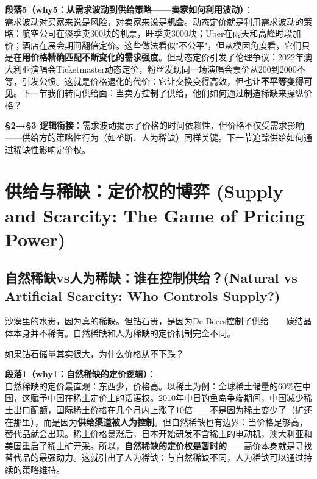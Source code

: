 \documentclass[../main.tex]{subfiles}
\begin{document}
	\textbf{段落5（why5：从需求波动到供给策略——卖家如何利用波动）}：\\
	需求波动对买家来说是风险，对卖家来说是\textbf{机会}。动态定价就是利用需求波动的策略：航空公司在淡季卖300块的机票，旺季卖3000块；Uber在雨天和高峰时段加价；酒店在展会期间翻倍定价。这些做法看似"不公平"，但从模因角度看，它们只是在\textbf{用价格精确匹配不断变化的需求强度}。但动态定价引发了伦理争议：2022年澳大利亚演唱会Ticketmaster动态定价，粉丝发现同一场演唱会票价从200到2000不等，引发公愤。这就是价格退化的代价：它让交换变得高效，但也让\textbf{不平等变得可见}。下一节我们转向供给面：当卖方控制了供给，他们如何通过制造稀缺来操纵价格？

	\textbf{§2→§3 逻辑衔接}：需求波动揭示了价格的时间依赖性，但价格不仅受需求影响——供给方的策略性行为（如垄断、人为稀缺）同样关键。下一节追踪供给如何通过稀缺性影响定价权。

	\section{供给与稀缺：定价权的博弈 (Supply and Scarcity: The Game of Pricing Power)}

	\subsection{自然稀缺vs人为稀缺：谁在控制供给？(Natural vs Artificial Scarcity: Who Controls Supply?)}
	\begin{motivation}
		沙漠里的水贵，因为真的稀缺。但钻石贵，是因为De Beers控制了供给——碳结晶体本身并不稀有。自然稀缺和人为稀缺的定价机制完全不同。
	\end{motivation}
	\begin{questionbox}
		如果钻石储量其实很大，为什么价格从不下跌？
	\end{questionbox}

	\textbf{段落1（why1：自然稀缺的定价逻辑）}：\\
	自然稀缺的定价最直观：东西少，价格高。以稀土为例：全球稀土储量的60\%在中国，这赋予中国在稀土定价上的话语权。2010年中日钓鱼岛争端期间，中国减少稀土出口配额，国际稀土价格在几个月内上涨了10倍——不是因为稀土变少了（矿还在那里），而是因为\textbf{供给渠道被人为控制}。但自然稀缺也有边界：当价格足够高，替代品就会出现。稀土价格暴涨后，日本开始研发不含稀土的电动机，澳大利亚和美国重启了稀土矿开采。所以，\textbf{自然稀缺的定价权是暂时的}——高价本身就是寻找替代品的最强动力。这就引出了人为稀缺：与自然稀缺不同，人为稀缺可以通过持续的策略维持。
\end{document}
